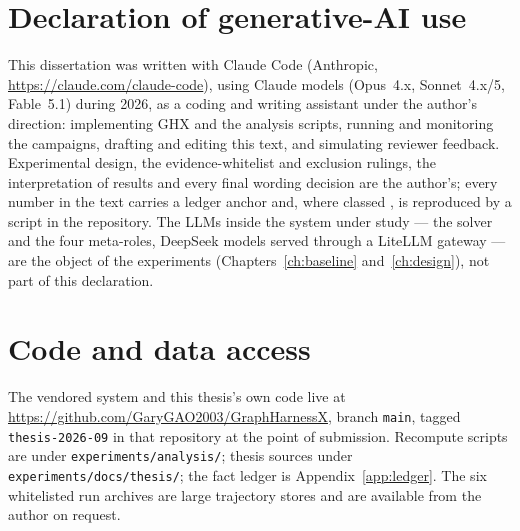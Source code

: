 
\section*{Declaration of generative-AI use}

This dissertation was written with Claude Code (Anthropic,
\url{https://claude.com/claude-code}), using Claude models (Opus~4.x,
Sonnet~4.x/5, Fable~5.1) during 2026, as a coding and writing assistant
under the author's direction: implementing GHX and the analysis scripts,
running and monitoring the campaigns, drafting and editing this text, and
simulating reviewer feedback. Experimental design, the evidence-whitelist
and exclusion rulings, the interpretation of results and every final
wording decision are the author's; every number in the text carries a
ledger anchor and, where classed , is reproduced by a script in the
repository. The LLMs inside the system under study --- the solver and the
four meta-roles, DeepSeek models served through a LiteLLM gateway --- are
the object of the experiments (Chapters~\ref{ch:baseline}
and~\ref{ch:design}), not part of this declaration.

\section*{Code and data access}

The vendored system and this thesis's own code live at
\url{https://github.com/GaryGAO2003/GraphHarnessX}, branch
\texttt{main}, tagged \texttt{thesis-2026-09} in that repository at the
point of submission. Recompute scripts are under
\texttt{experiments/analysis/}; thesis sources under
\texttt{experiments/docs/thesis/}; the fact ledger is
Appendix~\ref{app:ledger}. The six whitelisted run archives are large
trajectory stores and are available from the author on request.
